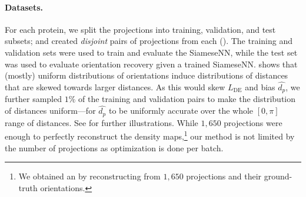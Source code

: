 \paragraph{Datasets.}
For each protein, we split the projections into training, validation, and test subsets; and created \textit{disjoint} pairs of projections from each ().
The training and validation sets were used to train and evaluate the SiameseNN, while the test set was used to evaluate orientation recovery given a trained SiameseNN.
 shows that (mostly) uniform distributions of orientations induce distributions of distances that are skewed towards larger distances.
As this would skew $L_\text{DE}$ and bias $\widehat{d_p}$, we further sampled $1\%$ of the training and validation pairs to make the distribution of distances uniform---for $\widehat{d_p}$ to be uniformly accurate over the whole $[0,\pi]$ range of distances.
See  for further illustrations.
While $1,650$ projections were enough to perfectly reconstruct the density maps,\footnote{We obtained an  by reconstructing from $1,650$ projections and their ground-truth orientations.} our method is not limited by the number of projections as optimization is done per batch.

